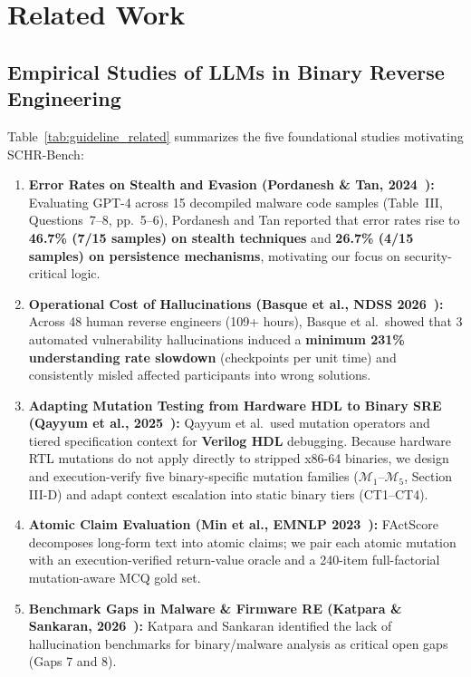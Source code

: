 \documentclass[conference]{IEEEtran}
\begin{document}
\section{Related Work}

\subsection{Empirical Studies of LLMs in Binary Reverse Engineering}
Table~\ref{tab:guideline_related} summarizes the five foundational studies motivating SCHR-Bench:
\begin{enumerate}
    \item \textbf{Error Rates on Stealth and Evasion (Pordanesh \& Tan, 2024~\cite{pordanesh2024exploring}):} Evaluating GPT-4 across 15 decompiled malware code samples (Table~III, Questions~7--8, pp.~5--6), Pordanesh and Tan reported that error rates rise to \textbf{46.7\% (7/15 samples) on stealth techniques} and \textbf{26.7\% (4/15 samples) on persistence mechanisms}, motivating our focus on security-critical logic.
    \item \textbf{Operational Cost of Hallucinations (Basque et al., NDSS 2026~\cite{basque2026decompiling}):} Across 48 human reverse engineers (109+ hours), Basque et al.\ showed that 3 automated vulnerability hallucinations induced a \textbf{minimum 231\% understanding rate slowdown} (checkpoints per unit time) and consistently misled affected participants into wrong solutions.
    \item \textbf{Adapting Mutation Testing from Hardware HDL to Binary SRE (Qayyum et al., 2025~\cite{qayyum2025verilog}):} Qayyum et al.\ used mutation operators and tiered specification context for \textbf{Verilog HDL} debugging. Because hardware RTL mutations do not apply directly to stripped x86-64 binaries, we design and execution-verify five binary-specific mutation families ($\mathcal{M}_1$--$\mathcal{M}_5$, Section III-D) and adapt context escalation into static binary tiers (CT1--CT4).
    \item \textbf{Atomic Claim Evaluation (Min et al., EMNLP 2023~\cite{min2023factscore}):} FActScore decomposes long-form text into atomic claims; we pair each atomic mutation with an execution-verified return-value oracle and a 240-item full-factorial mutation-aware MCQ gold set.
    \item \textbf{Benchmark Gaps in Malware \& Firmware RE (Katpara \& Sankaran, 2026~\cite{katpara2026firmware}):} Katpara and Sankaran identified the lack of hallucination benchmarks for binary/malware analysis as critical open gaps (Gaps 7 and 8).
\end{enumerate}
\end{document}
